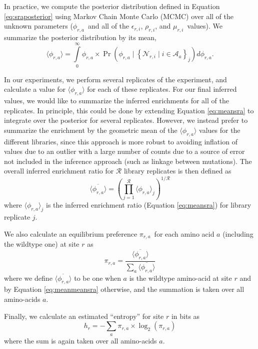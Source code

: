 \documentclass[10pt]{article}
\newcommand{\eri}{\mbox{$\epsilon_{r,i}$}}
\newcommand{\rri}{\mbox{$\rho_{r,i}$}}
\newcommand{\mri}{\mbox{$\mu_{r,i}$}}
\newcommand{\sra}{\mbox{$\phi_{r,a}$}}
\newcommand{\pira}{\mbox{$\pi_{r,a}$}}
\newcommand{\hr}{\mbox{$h_r$}}
\begin{document}
In practice, we compute the posterior distribution defined in Equation \ref{eq:sraposterior} using Markov Chain Monte Carlo (MCMC) over all of the unknown parameters (\sra\ and all of the \eri, \rri, and \mri\ values). We summarize the posterior distribution by its mean, 
\begin{equation}
\label{eq:meansra}
\langle \sra \rangle = \int\limits_{0}^{\infty} \sra \times \Pr\left(\sra \mid \left\{\mathcal{N}_{r,i} \mid i \in \mathcal{A}_a \right\}_j \right) d\sra.
\end{equation}

In our experiments, we perform several replicates of the experiment, and calculate a value for $\langle \sra \rangle$ for each of these replicates. For our final inferred values, we would like to summarize the inferred enrichments for all of the replicates. In principle, this could be done by extending Equation \ref{eq:meansra} to integrate over the posterior for several replicates. However, we instead prefer to summarize the enrichment by the geometric mean of the $\langle \sra \rangle$ values for the different libraries, since this approach is more robust to avoiding inflation of values due to an outlier with a large number of counts due to a source of error not included in the inference approach (such as linkage between mutations). The overall inferred enrichment ratio for $\mathcal{R}$ library replicates is then defined as
\begin{equation}
\label{eq:meanmeansra}
\overline{\langle \sra \rangle} = \left(\prod\limits_{j=1}^{\mathcal{R}} \langle \sra \rangle_j \right)^{1 / \mathcal{R}}
\end{equation}
where $\langle \sra \rangle_j$ is the inferred enrichment ratio (Equation \ref{eq:meansra}) for library replicate $j$.

We also calculate an equilibrium preference \pira\ for each amino acid $a$ (including the wildtype one) at site $r$ as
\begin{equation}
\label{eq:pira}
\pira = 
\frac{\overline{\langle \sra \rangle}}{\sum\limits_a \overline{\langle \sra \rangle}}
\end{equation}
where we define $\overline{\langle \sra \rangle}$ to be one when $a$ is the wildtype amino-acid at site $r$ and by Equation \ref{eq:meanmeansra} otherwise, and the summation is taken over all amino-acids $a$.

Finally, we calculate an estimated ``entropy'' for site $r$ in bits as
\begin{equation}
\hr = -\sum\limits_a \pira \times \log_2 \left(\pira\right)
\end{equation}
where the sum is again taken over all amino-acids $a$.
\end{document}
